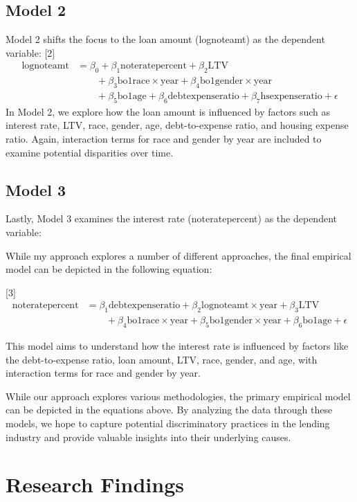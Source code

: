 \documentclass[12pt,english]{article}
\begin{document}
\subsection{Model 2}
Model 2 shifts the focus to the loan amount (lognoteamt) as the dependent variable:
[2]
\begin{align*}
\text{lognoteamt} &= \beta_0 + \beta_1 \text{noteratepercent} + \beta_2 \text{LTV} \\
&\qquad + \beta_3 \text{bo1race} \times \text{year} + \beta_4 \text{bo1gender} \times \text{year} \\
&\qquad + \beta_5 \text{bo1age} + \beta_6 \text{debtexpenseratio} + \beta_7 \text{hsexpenseratio} + \epsilon
\end{align*}
In Model 2, we explore how the loan amount is influenced by factors such as interest rate, LTV, race, gender, age, debt-to-expense ratio, and housing expense ratio. Again, interaction terms for race and gender by year are included to examine potential disparities over time.

\subsection{Model 3}
Lastly, Model 3 examines the interest rate (noteratepercent) as the dependent variable:

While my approach explores a number of different approaches, the final empirical model can be depicted in the following equation:

[3]
\begin{align*}
\text{noteratepercent} &= \beta_1 \text{debtexpenseratio} + \beta_2 \text{lognoteamt} \times \text{year} + \beta_3 \text{LTV} \\
&\qquad + \beta_4 \text{bo1race} \times \text{year} + \beta_5 \text{bo1gender} \times \text{year} + \beta_6 \text{bo1age} + \epsilon
\end{align*}

This model aims to understand how the interest rate is influenced by factors like the debt-to-expense ratio, loan amount, LTV, race, gender, and age, with interaction terms for race and gender by year.

While our approach explores various methodologies, the primary empirical model can be depicted in the equations above. By analyzing the data through these models, we hope to capture potential discriminatory practices in the lending industry and provide valuable insights into their underlying causes. 

\section{Research Findings}\label{sec:results}
\end{document}
